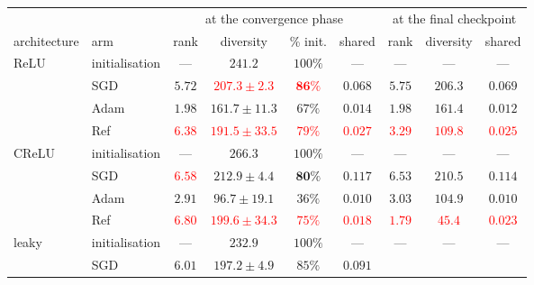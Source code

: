 \documentclass{article}
\newcommand{\nat}[1]{\textcolor{red}{#1}}
\theoremstyle{definition}
\theoremstyle{remark}
\begin{document}
\begin{center}\small
\begin{adjustbox}{max width=\linewidth}
\begin{tabular}{llcccc|ccc}
\toprule
 & & \multicolumn{4}{c|}{at the convergence phase} & \multicolumn{3}{c}{at the final checkpoint} \\
architecture & arm & rank & diversity & \% init. & shared & rank & diversity & shared \\
\midrule
ReLU  & initialisation   & ---             & $241.2$                   & $100\%$         & ---
                         & ---             & ---                       & --- \\
      & SGD & $5.72$          & \nat{$\mathbf{207.3 \pm 2.3}$}           & \nat{$\mathbf{86\%}$}          & $0.068$
                         & $5.75$          & $206.3$                   & $0.069$ \\
      & Adam             & $1.98$          & $161.7 \pm 11.3$          & $67\%$          & $0.014$
                         & $1.98$          & $161.4$                   & $0.012$ \\
      & Ref        & \nat{$\mathbf{6.38}$} & \nat{$191.5 \pm 33.5$}  & \nat{$79\%$} & \nat{$0.027$}
                         & \nat{$3.29$}          & \nat{$109.8$}                    & \nat{$0.025$} \\
\midrule
CReLU & initialisation   & ---             & $266.3$                   & $100\%$         & ---
                         & ---             & ---                       & --- \\
      & SGD & \nat{$6.58$} & $\mathbf{212.9 \pm 4.4}$  & $\mathbf{80\%}$ & $0.117$
                         & $6.53$          & $210.5$                   & $0.114$ \\
      & Adam             & $2.91$          & $96.7 \pm 19.1$           & $36\%$          & $0.010$
                         & $3.03$          & $104.9$                   & $0.010$ \\
      & Ref        & \nat{$\mathbf{6.80}$}          & \nat{$199.6 \pm 34.3$}          & \nat{$75\%$}          & \nat{$0.018$}
                         & \nat{$1.79$}          & \nat{$45.4$}                    & \nat{$0.023$} \\
\midrule
leaky & initialisation   & ---             & $232.9$                   & $100\%$         & ---
                         & ---             & ---                       & --- \\
      & SGD & $6.01$          & $197.2 \pm 4.9$           & $85\%$          & $0.091$

\end{tabular}
\end{adjustbox}
\end{center}
\end{document}
